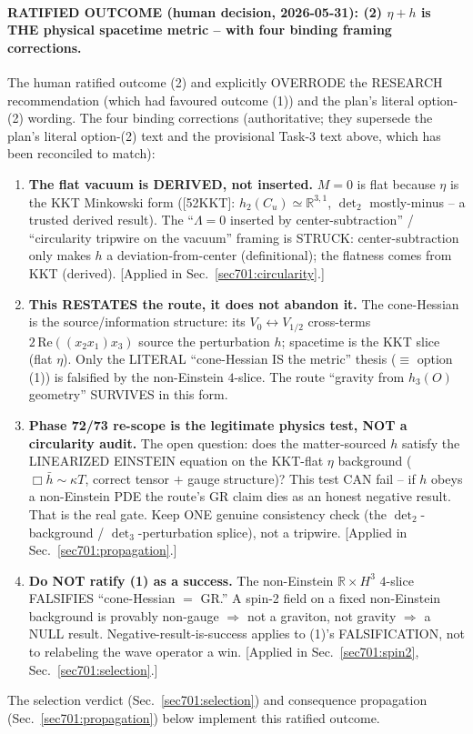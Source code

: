 \paragraph{RATIFIED OUTCOME (human decision, 2026-05-31): (2) $\eta+h$ is THE physical
spacetime metric -- with four binding framing corrections.} The human ratified outcome (2)
and explicitly OVERRODE the RESEARCH recommendation (which had favoured outcome (1)) and
the plan's literal option-(2) wording. The four binding corrections (authoritative; they
supersede the plan's literal option-(2) text and the provisional Task-3 text above, which
has been reconciled to match):
\begin{enumerate}
  \item \textbf{The flat vacuum is DERIVED, not inserted.} $M=0$ is flat because $\eta$ is
        the KKT Minkowski form ([52KKT]: $h_2(C_u)\simeq\mathbb{R}^{3,1}$, $\det_2$
        mostly-minus -- a trusted derived result). The ``$\Lambda=0$ inserted by
        center-subtraction'' / ``circularity tripwire on the vacuum'' framing is STRUCK:
        center-subtraction only makes $h$ a deviation-from-center (definitional); the
        flatness comes from KKT (derived). [Applied in Sec.~\ref{sec701:circularity}.]
  \item \textbf{This RESTATES the route, it does not abandon it.} The cone-Hessian is the
        source/information structure: its $V_0\!\leftrightarrow\!V_{1/2}$ cross-terms
        $2\,\mathrm{Re}((x_2 x_1)x_3)$ source the perturbation $h$; spacetime is the KKT
        slice (flat $\eta$). Only the LITERAL ``cone-Hessian IS the metric'' thesis
        ($\equiv$ option (1)) is falsified by the non-Einstein $4$-slice. The route
        ``gravity from $h_3(O)$ geometry'' SURVIVES in this form.
  \item \textbf{Phase 72/73 re-scope is the legitimate physics test, NOT a circularity
        audit.} The open question: does the matter-sourced $h$ satisfy the LINEARIZED
        EINSTEIN equation on the KKT-flat $\eta$ background ($\Box\bar h\sim\kappa T$,
        correct tensor $+$ gauge structure)? This test CAN fail -- if $h$ obeys a
        non-Einstein PDE the route's GR claim dies as an honest negative result. That is
        the real gate. Keep ONE genuine consistency check (the $\det_2$-background /
        $\det_3$-perturbation splice), not a tripwire. [Applied in
        Sec.~\ref{sec701:propagation}.]
  \item \textbf{Do NOT ratify (1) as a success.} The non-Einstein $\mathbb{R}\times H^3$
        $4$-slice FALSIFIES ``cone-Hessian $=$ GR.'' A spin-2 field on a fixed non-Einstein
        background is provably non-gauge $\Rightarrow$ not a graviton, not gravity $\Rightarrow$
        a NULL result. Negative-result-is-success applies to (1)'s FALSIFICATION, not to
        relabeling the wave operator a win. [Applied in Sec.~\ref{sec701:spin2},
        Sec.~\ref{sec701:selection}.]
\end{enumerate}
The selection verdict (Sec.~\ref{sec701:selection}) and consequence propagation
(Sec.~\ref{sec701:propagation}) below implement this ratified outcome.

